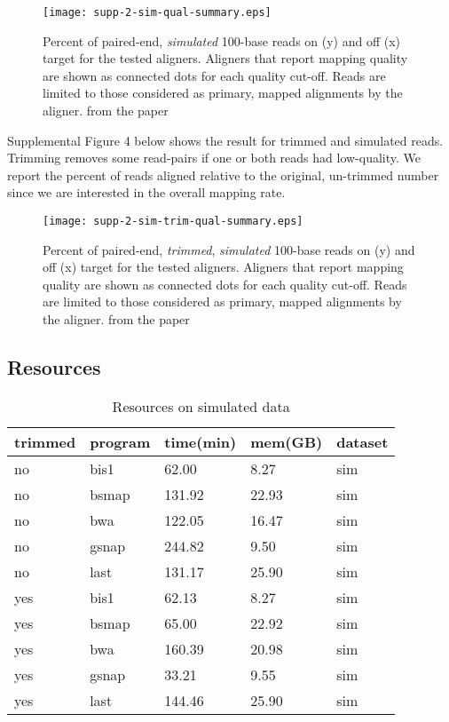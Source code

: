 \documentclass[12pt]{article}
\begin{document}
\begin{figure}[H]%
    \centerline{\texttt{[image: supp-2-sim-qual-summary.eps]}}
    \caption{Percent of paired-end, \emph{simulated} 100-base reads on (y) and off (x) target for the tested aligners. Aligners that report mapping quality are shown as connected dots for each quality cut-off. Reads are limited to those considered as primary, mapped alignments by the aligner.
from the paper}\label{suppfig:03}
\end{figure}

Supplemental Figure 4 below shows the result for trimmed and simulated reads.
Trimming removes some read-pairs if one or both reads had low-quality. We
report the percent of reads aligned relative to the original, un-trimmed number
since we are interested in the overall mapping rate.

\begin{figure}[H]%
    \centerline{\texttt{[image: supp-2-sim-trim-qual-summary.eps]}}
    \caption{Percent of paired-end, \emph{trimmed}, \emph{simulated} 100-base reads on (y) and off (x) target for the tested aligners. Aligners that report mapping quality are shown as connected dots for each quality cut-off. Reads are limited to those considered as primary, mapped alignments by the aligner.
from the paper}\label{suppfig:04}
\end{figure}

\subsection{Resources}

\begin{table}[H]
    \centering
    \caption{Resources on simulated data}
    \begin{tabular}{lllll} \hline
    trimmed & program & time(min) & mem(GB) & dataset \\ \hline
    no      & bis1    & 62.00     & 8.27    & sim     \\
    no      & bsmap   & 131.92    & 22.93   & sim     \\
    no      & bwa     & 122.05    & 16.47   & sim     \\
    no      & gsnap   & 244.82    & 9.50    & sim     \\
    no      & last    & 131.17    & 25.90   & sim     \\
    yes     & bis1    & 62.13     & 8.27    & sim     \\
    yes     & bsmap   & 65.00     & 22.92   & sim     \\
    yes     & bwa     & 160.39    & 20.98   & sim     \\
    yes     & gsnap   & 33.21     & 9.55    & sim     \\
    yes     & last    & 144.46    & 25.90   & sim     \\
    \end{tabular}
\end{table}
\end{document}
